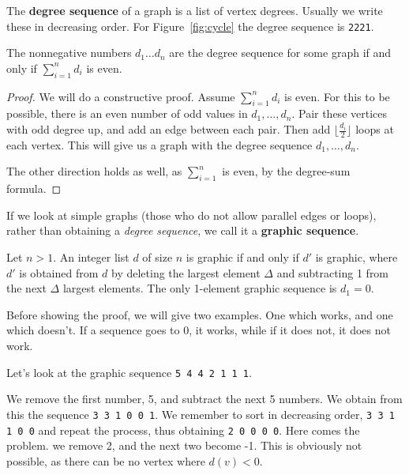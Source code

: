 The \textbf{degree sequence} of a graph is a list of vertex degrees. Usually we write these in decreasing order. For Figure~\ref{fig:cycle} the degree sequence is \texttt{2221}.

\begin{proposition}
	The nonnegative numbers $d_1 \ldots d_n$ are the degree sequence for some graph if and only if $\sum_{i=1}^n d_{i}$ is even.
\end{proposition}

\begin{proof}
	We will do a constructive proof.
	Assume $\sum_{i=1}^n d_{i}$ is even. For this to be possible, there is an even number of odd values in $d_{1}, \ldots, d_{n}$. Pair these vertices with odd degree up, and add an edge between each pair. Then add $\lfloor  \frac{d_{i}}{2} \rfloor$ loops at each vertex. This will give us a graph with the degree sequence $d_{1}, \ldots, d_{n}$.

	The other direction holds as well, as $\sum_{i=1}^n$ is even, by the degree-sum formula.
\end{proof}

If we look at simple graphs (those who do not allow parallel edges or loops), rather than obtaining a \textit{degree sequence}, we call it a \textbf{graphic sequence}.

\begin{proposition}
	Let $n > 1$. An integer list $d$ of size $n$ is graphic if and only if $d'$ is graphic, where $d'$ is obtained from $d$ by deleting the largest element \(\Delta\) and subtracting 1 from the next \(\Delta\) largest elements. The only 1-element graphic sequence is $d_{1} = 0$.
\end{proposition}

Before showing the proof, we will give two examples. One which works, and one which doesn't. If a sequence goes to 0, it works, while if it does not, it does not work.

\begin{example}
	Let's look at the graphic sequence \texttt{5 4 4 2 1 1 1}.

	We remove the first number, 5, and subtract the next 5 numbers. We obtain from this the sequence \texttt{3 3 1 0 0 1}. We remember to sort in decreasing order, \texttt{3 3 1 1 0 0} and repeat the process, thus obtaining \texttt{2 0 0 0 0}. Here comes the problem. we remove 2, and the next two become -1. This is obviously not possible, as there can be no vertex where $d(v) < 0$.
\end{example}

